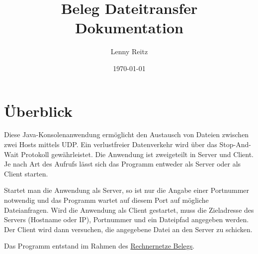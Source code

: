 \documentclass{article}
\title{Beleg Dateitransfer \\ \large Dokumentation}
\date{\today}
\author{Lenny Reitz}
\begin{document}
	\maketitle
	\newpage
	\tableofcontents
	\newpage

	\section{Überblick}
	Diese Java-Konsolenanwendung ermöglicht den Austausch von Dateien zwischen zwei Hosts mittels UDP. Ein verlustfreier Datenverkehr wird über das Stop-And-Wait Protokoll gewährleistet. Die Anwendung ist zweigeteilt in Server und Client. Je nach Art des Aufrufs lässt sich das Programm entweder als Server oder als Client starten.

	Startet man die Anwendung als Server, so ist nur die Angabe einer Portnummer notwendig und das Programm wartet auf diesem Port auf mögliche Dateianfragen. Wird die Anwendung als Client gestartet, muss die Zieladresse des Servers (Hostname oder IP), Portnummer und ein Dateipfad angegeben werden. Der Client wird dann versuchen, die angegebene Datei an den Server zu schicken.

	Das Programm entstand im Rahmen des \href{https://github.com/HTWDD-RN/Dateitransfer}{Rechnernetze Belegs}.

	\newpage
\end{document}
